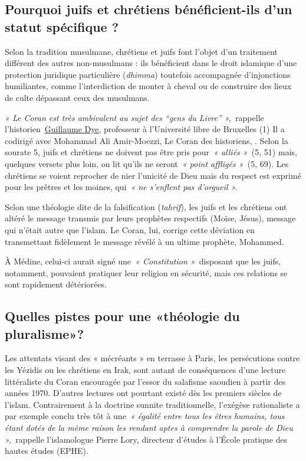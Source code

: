 \subsection{ Pourquoi juifs et chrétiens bénéficient-ils d'un statut
spécifique ?}

Selon la tradition musulmane, chrétiens et juifs font l'objet d'un
traitement différent des autres non-musulmans : ils bénéficient dans le
droit islamique d'une protection juridique particulière (\emph{dhimma})
toutefois accompagnée d'injonctions humiliantes, comme l'interdiction de
monter à cheval ou de construire des lieux de culte dépassant ceux des
musulmans.
 

\emph{« Le Coran est très ambivalent au sujet des ``gens du Livre''
»,~}rappelle
l'historien~\href{https://www.la-croix.com/Culture/Livres-et-idees/historiens-decryptent-Coran-avant-lislam-2019-11-27-1201063090}{\underline{Guillaume
Dye}}, professeur à l'Université libre de Bruxelles (1) Il a codirigé avec Mohammad Ali Amir-Moezzi, Le Coran des
historiens,  . Selon la
sourate 5, juifs et chrétiens ne doivent pas être pris pour~\emph{«
alliés »~}(5, 51) mais, quelques versets plus loin, on lit qu'ils ne
seront~\emph{« point affligés »~}(5, 69). Les chrétiens se voient
reprocher de nier l'unicité de Dieu mais du respect est exprimé pour les
prêtres et les moines, qui~\emph{« ne s'enflent pas d'orgueil ».}

\begin{Def}[tahrif]
Selon une théologie dite de la falsification (\emph{tahrif}), les juifs
et les chrétiens ont altéré le message transmis par leurs prophètes
respectifs (Moïse, Jésus), message qui n'était autre que l'islam. Le
Coran, lui, corrige cette déviation en transmettant fidèlement le
message révélé à un ultime prophète, Mohammed.
\end{Def}
 À Médine, celui-ci aurait
signé une~\emph{« Constitution »~}disposant que les juifs, notamment,
pouvaient pratiquer leur religion en sécurité, mais ces relations se
sont rapidement détériorées.

\subsection{Quelles pistes pour une «théologie du pluralisme»?}

Les attentats visant des « mécréants » en terrasse à Paris, les
persécutions contre les Yézidis ou les chrétiens en Irak, sont autant de
conséquences d'une lecture littéraliste du Coran encouragée par l'essor
du salafisme saoudien à partir des années 1970. D'autres lectures ont
pourtant existé dès les premiers siècles de l'islam. Contrairement à la
doctrine sunnite traditionnelle, l'exégèse rationaliste a par exemple
conclu très tôt à une~\emph{« égalité entre tous les êtres humains, tous
étant dotés de la même raison les rendant aptes à comprendre la parole
de Dieu »,~}rappelle l'islamologue Pierre Lory, directeur d'études à
l'École pratique des hautes études (EPHE).

